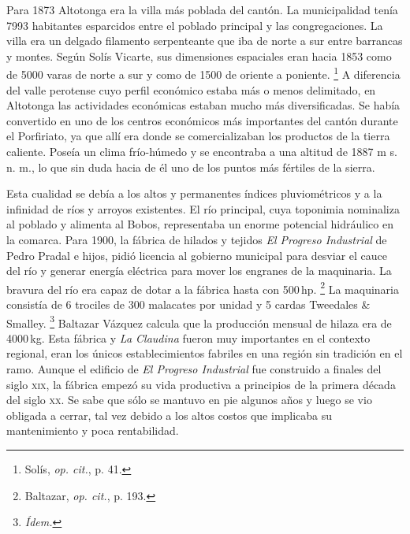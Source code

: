 \documentclass[14pt,twoside,final]{extbook} %
\let\oldfootnote\footnote
\renewcommand\footnote[1]{%
\oldfootnote{\hspace{1mm}#1}}
\begin{document}
Para 1873 Altotonga era la villa más poblada del cantón. La municipalidad tenía 7993 habitantes esparcidos entre el poblado principal y las congregaciones. La villa era un delgado filamento serpenteante que iba de norte a sur entre barrancas y montes. Según Solís Vicarte, sus dimensiones espaciales eran hacia 1853 como de 5000 varas de norte a sur y como de 1500 de oriente a poniente.\footnote{Solís, \emph{op. cit.}, p. 41.} A diferencia del valle perotense cuyo perfil económico estaba más o menos delimitado, en Altotonga las actividades económicas estaban mucho más diversificadas. Se había convertido en uno de los centros económicos más importantes del cantón durante el Porfiriato, ya que allí era donde se comercializaban los productos de la tierra caliente. Poseía un clima frío-húmedo y se encontraba a una altitud de 1887 m s. n. m., lo que sin duda hacia de él uno de los puntos más fértiles de la sierra.

Esta cualidad se debía a los altos y permanentes índices pluviométricos y a la infinidad de ríos y arroyos existentes. El río principal, cuya toponimia nominaliza al poblado y alimenta al Bobos, representaba un enorme potencial hidráulico en la comarca. Para 1900, la fábrica de hilados y tejidos \emph{El Progreso Industrial} de Pedro Pradal e hijos, pidió licencia al gobierno municipal para desviar el cauce del río y generar energía eléctrica para mover los engranes de la maquinaria. La bravura del río era capaz de dotar a la fábrica hasta con 500\,hp.\footnote{Baltazar, \emph{op. cit.}, p. 193.} La maquinaria consistía de 6 trociles de 300 malacates por unidad y 5 cardas Tweedales \& Smalley.\footnote{\em Ídem.} Baltazar Vázquez calcula que la producción mensual de hilaza era de 4000\,kg. Esta fábrica y \emph{La Claudina} fueron muy importantes en el contexto regional, eran los únicos establecimientos fabriles en una región sin tradición en el ramo. Aunque el edificio de \emph{El Progreso Industrial} fue construido a finales del siglo \textsc{xix}, la fábrica empezó su vida productiva a principios de la primera década del siglo \textsc{xx}. Se sabe que sólo se mantuvo en pie algunos años y luego se vio obligada a cerrar, tal vez debido a los altos costos que implicaba su mantenimiento y poca rentabilidad.
\end{document}
